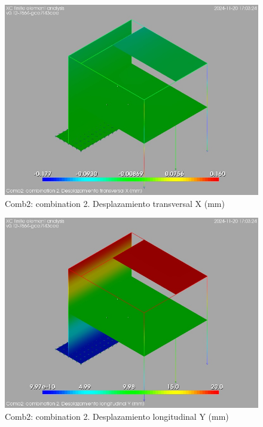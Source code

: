 \begin{figure}[ht]
\begin{center}
\includegraphics[width=\linewidth]{results/graphics/resSimplLC/LS2uX.png}
\caption{Comb2: combination 2. Desplazamiento transversal X (mm)}
\label{LS2uX}
\end{center}
\end{figure}
\begin{figure}[ht]
\begin{center}
\includegraphics[width=\linewidth]{results/graphics/resSimplLC/LS2uY.png}
\caption{Comb2: combination 2. Desplazamiento longitudinal Y (mm)}
\label{LS2uY}
\end{center}
\end{figure}
